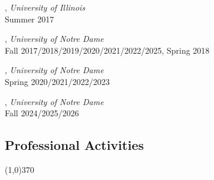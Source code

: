 \documentclass[10pt]{article}
\newenvironment{myindentpar}[1]%
{\begin{list}{}%
         {\setlength{\leftmargin}{#1}}%
         \item[]%
}
{\end{list}}
\newcounter{list}
\begin{document}
\begin{myindentpar}{0.75cm}

\hspace{-0.75cm}{\bf CS 412 Introduction to Data Mining}, \textit{University of Illinois} \\
	Summer 2017
	
\hspace{-0.75cm}{\bf CSE 40647/60647 Data Science}, \textit{University of Notre Dame}  \\
	Fall 2017/2018/2019/2020/2021/2022/2025, Spring 2018

\hspace{-0.75cm}{\bf CSE 60326 Computational Behavior Modeling}, \textit{University of Notre Dame} \\
	Spring 2020/2021/2022/2023

\hspace{-0.75cm}{\bf CSE 60556 Large Language Models}, \textit{University of Notre Dame} \\
	Fall 2024/2025/2026

\end{myindentpar}

\subsection{\sc Professional Activities}
\vspace{-0.4cm} \line(1,0){370} \vspace{-0.1cm}
\end{document}
